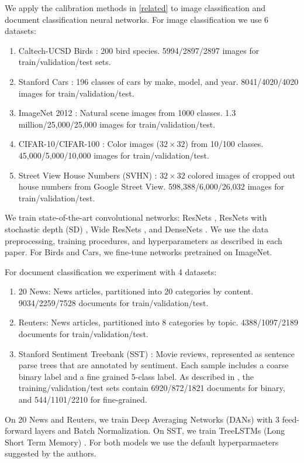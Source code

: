  \setlength{\abovedisplayskip}{4pt}
 \setlength{\belowdisplayskip}{4pt}
 \setlength{\textfloatsep}{4pt}

We apply the calibration methods in \autoref{related} to image classification and document classification neural networks.
For image classification we use 6 datasets:
\begin{enumerate}
\item Caltech-UCSD Birds \cite{cubdataset}: 200 bird species. 5994/2897/2897 images for train/validation/test sets.
\item Stanford Cars \cite{carsdataset}: 196 classes of cars by make, model, and year. 8041/4020/4020 images for train/validation/test.
\item ImageNet 2012 \cite{deng2009imagenet}: Natural scene images from 1000 classes. 1.3 million/25,000/25,000 images for train/validation/test.
\item CIFAR-10/CIFAR-100 \cite{krizhevsky2009learning}: Color images ($32\times 32$) from 10/100 classes. 45,000/5,000/10,000 images for train/validation/test.
\item Street View House Numbers (SVHN) \cite{netzer2011reading}: $32\times 32$ colored images of cropped out house numbers from Google Street View.
598,388/6,000/26,032 images for train/validation/test.
\end{enumerate}
%
We train state-of-the-art convolutional networks: ResNets \cite{he2015deep}, ResNets with stochastic depth (SD) \cite{huang2016deep}, Wide ResNets \cite{zagoruyko2016wide}, and DenseNets \cite{huang2016densely}. We use the data preprocessing, training procedures, and hyperparameters as described in each paper. For Birds and Cars, we fine-tune networks pretrained on ImageNet.

For document classification we experiment with 4 datasets:
\begin{enumerate}
\item 20 News: News articles, partitioned into 20 categories by content. 9034/2259/7528 documents for train/validation/test.
\item Reuters: News articles, partitioned into 8 categories by topic. 4388/1097/2189 documents for train/validation/test.
\item Stanford Sentiment Treebank (SST) \cite{socher2013recursive}: Movie reviews, represented as sentence parse trees that are annotated by sentiment. Each sample includes a coarse binary label and a fine grained 5-class label.
As described in \cite{tai2015improved}, the training/validation/test sets contain 6920/872/1821 documents for binary, and 544/1101/2210 for fine-grained.
\end{enumerate}
On 20 News and Reuters, we train Deep Averaging Networks (DANs) \cite{iyyer2015deep} with 3 feed-forward layers and Batch Normalization.  On SST, we train \mbox{TreeLSTMs} (Long Short Term Memory) \cite{tai2015improved}.
For both models we use the default hyperparmaeters suggested by the authors.

